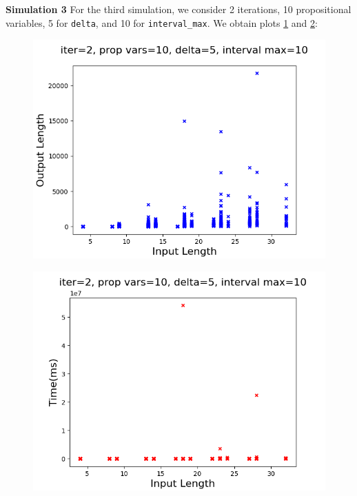 \documentclass[runningheads]{llncs}
\begin{document}
\noindent\textbf{Simulation 3}
For the third simulation, we consider 2 iterations, 10 propositional variables, 5 for \texttt{delta}, and 10 for \texttt{interval\_max}. We obtain plots \ref{fig:InLenVsOutLen3} and \ref{fig:InLenVsRunTime3}:\\
\begin{minipage}{0.5 \textwidth}
    \begin{figure}[H]
    \centering
    \includegraphics[scale=0.35]{images/Sim3Length_large.png}
    \label{fig:InLenVsOutLen3}
    \end{figure}
\end{minipage}
\begin{minipage}{0.5 \textwidth}
    \begin{figure}[H]
    \centering
    \includegraphics[scale=0.35]{images/Sim3Time_large.png}
    \label{fig:InLenVsRunTime3}
    \end{figure}
\end{minipage}\\
\end{document}
